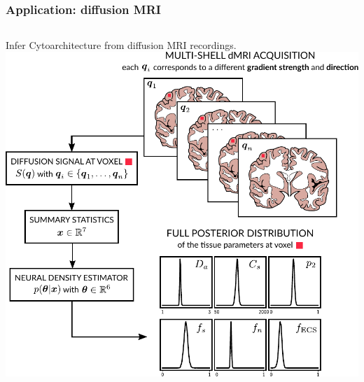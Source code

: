 \documentclass{beamer}
\begin{document}
\begin{frame}
\begin{columns}
            {\\}

        \end{columns}


    \end{frame}

    \begin{frame}
        \frametitle{Application: diffusion MRI }

        \begin{columns}
            Infer Cytoarchitecture from diffusion MRI recordings.
            \centering
            \includegraphics[height=.9\textheight]{sbi-dmri-pipeline}\\
        \end{columns}
    \end{frame}
\end{document}
